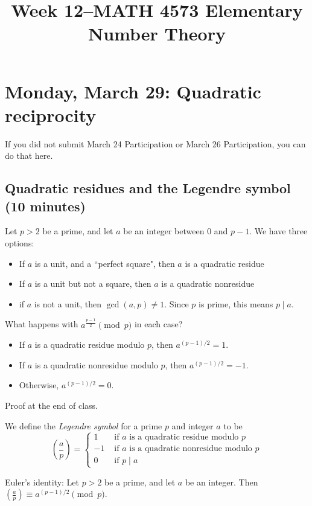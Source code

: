 \documentclass[letterpaper, 11 pt]{article}
\title{Week 12--MATH 4573 Elementary Number Theory}
\begin{document}
\maketitle
\tableofcontents
\section{Monday, March 29: Quadratic reciprocity}
If you did not submit March 24 Participation or March 26 Participation, you can do that here.

\subsection{Quadratic residues and the Legendre symbol (10 minutes)}

   Let $p>2$ be a prime, and let $a$ be an integer between $0$ and $p-1$. We have three options: 
 
\begin{itemize}
 \item If $a$ is a unit, and a ``perfect square", then $a$ is a quadratic residue
 \item If $a$ is a unit but not a square, then $a$ is a quadratic nonresidue
 \item if $a$ is not a unit, then $\gcd(a,p)\neq 1$. Since $p$ is prime, this means $p\mid a$.
\end{itemize}

\begin{br}[1 min]
 What happens with $a^\frac{p-1}{2} \pmod p$ in each case?
\end{br}
\begin{itemize}
 \item If $a$ is a quadratic residue modulo $p$, then $a^{(p-1)/2}=  {1}
 $.
 \item If $a$ is a quadratic nonresidue modulo $p$, then $a^{(p-1)/2}=  {-1}
 $.
 \item Otherwise, $a^{(p-1)/2}=  {0}
 $.
\end{itemize}
  
  
  Proof at the end of class.

\begin{defn}
 We define the \emph{Legendre symbol} for a prime $p$ and integer $a$ to be \[\left(\frac{a}{p}\right)
=\begin{cases}
 1 & \textrm{ if $a$ is a quadratic residue modulo $p$}\\
 -1 & \textrm{ if $a$ is a quadratic nonresidue modulo $p$}\\
 0&  \textrm{ if $p\mid a$}
 \end{cases}
\]
\end{defn}
   Euler's identity:  Let $p>2$ be a prime, and let $a$ be an integer. Then $\left(  {\frac{a}{p}}
 \right)\equiv a^{(p-1)/2} \pmod p$.
 
\end{document}
